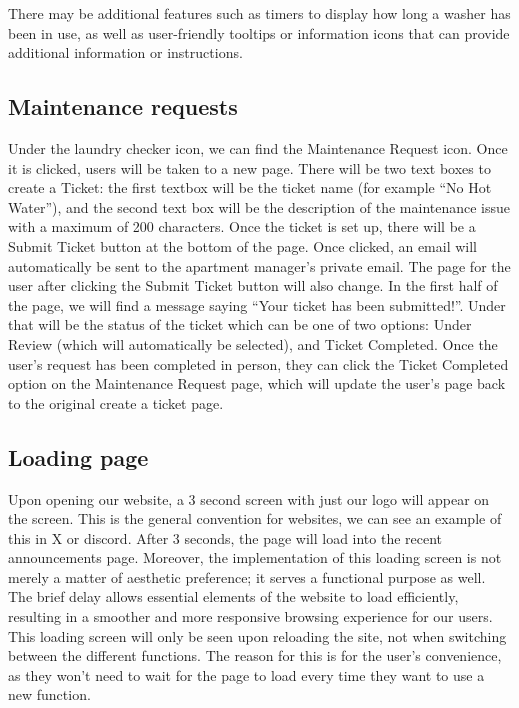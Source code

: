 \documentclass[conference]{IEEEtran}
\begin{document}
There may be additional features such as timers to display how long a washer has been in use, as well as user-friendly tooltips or information icons that can provide additional information or instructions.
\subsection{Maintenance requests}
Under the laundry checker icon, we can find the Maintenance Request icon. Once it is clicked, users will be taken to a new page. There will be two text boxes to create a Ticket: the first textbox will be the ticket name (for example “No Hot Water”), and the second text box will be the description of the maintenance issue with a maximum of 200 characters. Once the ticket is set up, there will be a Submit Ticket button at the bottom of the page. Once clicked, an email will automatically be sent to the apartment manager's private email. The page for the user after clicking the Submit Ticket button will also change. In the first half of the page, we will find a message saying “Your ticket has been submitted!”. Under that will be the status of the ticket which can be one of two options: Under Review (which will automatically be selected), and Ticket Completed. Once the user’s request has been completed in person, they can click the Ticket Completed option on the Maintenance Request page, which will update the user’s page back to the original create a ticket page.
\subsection{Loading page}
Upon opening our website, a 3 second screen with just our logo will appear on the screen. This is the general convention for websites, we can see an example of this in X or discord. After 3 seconds, the page will load into the recent announcements page. Moreover, the implementation of this loading screen is not merely a matter of aesthetic preference; it serves a functional purpose as well. The brief delay allows essential elements of the website to load efficiently, resulting in a smoother and more responsive browsing experience for our users. This loading screen will only be seen upon reloading the site, not when switching between the different functions. The reason for this is for the user's convenience, as they won’t need to wait for the page to load every time they want to use a new function.
\end{document}
